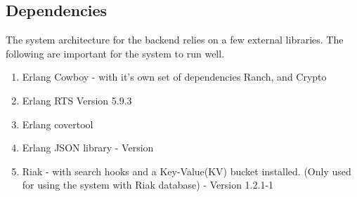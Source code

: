\subsection {Dependencies}

The system architecture for the backend relies on a few external libraries. The following are important for the system to run well. 

\begin {enumerate}
\item Erlang Cowboy - with it's own set of dependencies Ranch, and Crypto
\item Erlang RTS Version 5.9.3
\item Erlang covertool
\item Erlang JSON library - Version 
\item Riak - with search hooks and a Key-Value(KV) bucket installed.
		(Only used for using the system with Riak database) - Version 1.2.1-1
\end {enumerate}
